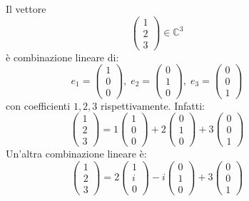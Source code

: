\documentclass[a4paper]{article}
\theoremstyle{break}
\theoremstyle{break}
\theoremstyle{break}
\theoremstyle{break}
\begin{document}
  \begin{figure}[H]
    \begin{example}
      Il vettore \[ \begin{pmatrix} 1\\2\\3 \end{pmatrix} \in \mathbb{C}^3 \] 
      è combinazione lineare di:
      \[
      e_1 = \begin{pmatrix} 1\\0\\0 \end{pmatrix},\; e_2 = \begin{pmatrix} 0\\1\\0 \end{pmatrix},\; e_3 = \begin{pmatrix} 0\\0\\1 \end{pmatrix}
      \] 
      con coefficienti \( 1,2,3 \) rispettivamente. Infatti:
      \[
      \begin{pmatrix} 1\\2\\3 \end{pmatrix} = 1 \begin{pmatrix} 1\\0\\0 \end{pmatrix} + 2 \begin{pmatrix} 0\\1\\0 \end{pmatrix} + 3 \begin{pmatrix} 0\\0\\1 \end{pmatrix}
      \] 
      Un'altra combinazione lineare è:
      \[
      \begin{pmatrix} 1\\2\\3 \end{pmatrix} = 2 \begin{pmatrix} 1\\i\\0 \end{pmatrix} - i \begin{pmatrix} 0\\1\\0 \end{pmatrix} + 3 \begin{pmatrix} 0\\0\\1 \end{pmatrix}
      \] 
    \end{example}
  \end{figure}
\end{document}
